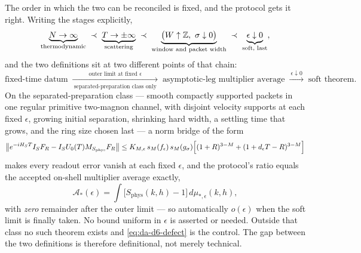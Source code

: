 The order in which the two can be reconciled is fixed, and the protocol gets it
right. Writing the stages explicitly,
\begin{equation}
  \underbrace{N\to\infty}_{\text{thermodynamic}}
  \;\prec\;
  \underbrace{T\to\pm\infty}_{\text{scattering}}
  \;\prec\;
  \underbrace{\bigl(W\uparrow\mathbb{Z},\ \sigma\downarrow0\bigr)}_{\text{window and packet width}}
  \;\prec\;
  \underbrace{\epsilon\downarrow0}_{\text{soft, last}} ,
  \label{eq:da-order}
\end{equation}
and the two definitions sit at two different points of that chain:
\begin{equation}
  \text{fixed-time datum}
  \;\xrightarrow[\ \text{separated-preparation class only}\ ]
              {\ \text{outer limit at fixed }\epsilon\ }\;
  \text{asymptotic-leg multiplier average}
  \;\xrightarrow{\ \epsilon\downarrow0\ }\;
  \text{soft theorem.}
  \label{eq:da-soft-diagram}
\end{equation}
On the separated-preparation class --- smooth compactly supported packets in one
regular primitive two-magnon channel, with disjoint velocity supports at each
fixed $\epsilon$, growing initial separation, shrinking hard width, a settling
time that grows, and the ring size chosen last --- a norm bridge of the form
\begin{equation}
  \bigl\|e^{-iH_ST}I_SF_R-I_SU_0(T)M_{S_{\mathrm{phys}}}F_R\bigr\|
  \le K_{M,\epsilon}\,s_M(f_\epsilon)\,s_M(g_\sigma)
     \Bigl[(1+R)^{3-M}+(1+d_\epsilon T-R)^{3-M}\Bigr]
  \label{eq:da-norm-bridge}
\end{equation}
makes every readout error vanish at each fixed $\epsilon$, and the protocol's
ratio equals the accepted on-shell multiplier average exactly,
\begin{equation}
  \mathcal A_*(\epsilon)=\int\bigl[S_{\mathrm{phys}}(k,h)-1\bigr]\,d\mu_{*,\epsilon}(k,h),
  \label{eq:da-zero-remainder}
\end{equation}
with \emph{zero} remainder after the outer limit --- so automatically $o(\epsilon)$
when the soft limit is finally taken. No bound uniform in $\epsilon$ is asserted
or needed. Outside that class no such theorem exists and
\eqref{eq:da-d6-defect} is the control. The gap between the two definitions is
therefore definitional, not merely technical.


